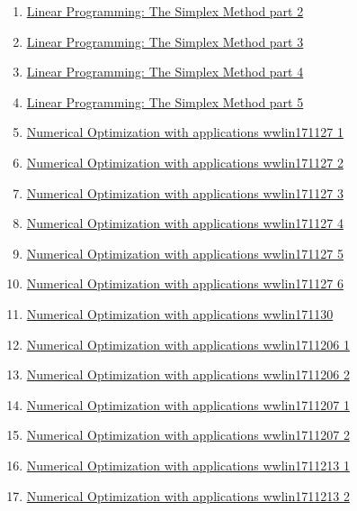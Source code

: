 \documentclass[11pt]{article}
\begin{document}
\begin{enumerate}
	\item \href{https://mp.weixin.qq.com/s/Alzpdjr_mm7GrfE4gVTnPg}{Linear Programming: The Simplex Method part 2}	%
	\item \href{https://mp.weixin.qq.com/s/bJTERRekBH3C9kWN4nvLeg}{Linear Programming: The Simplex Method part 3}	%
	\item \href{https://mp.weixin.qq.com/s/oLZ-1hcsUJasGePLI3KRDg}{Linear Programming: The Simplex Method part 4}	%
	\item \href{https://mp.weixin.qq.com/s/luKMteTACIdbsFNb-bZzNw}{Linear Programming: The Simplex Method part 5}	%
	\item \href{https://mp.weixin.qq.com/s/2ZRzr632s-GtuWGSZgGE0Q}{Numerical Optimization with applications wwlin171127 1}	%
	\item \href{https://mp.weixin.qq.com/s/SDShJZap6JcKOmwg54zO6A}{Numerical Optimization with applications wwlin171127 2}	%
	\item \href{https://mp.weixin.qq.com/s/5DhMMibI_JAZDdl3vX0HYg}{Numerical Optimization with applications wwlin171127 3}	%
	\item \href{https://mp.weixin.qq.com/s/2uhwXd2kA8L-DglJEpvOxA}{Numerical Optimization with applications wwlin171127 4}	%
	\item \href{https://mp.weixin.qq.com/s/rk57CKOfrBLUvtJchXynMw}{Numerical Optimization with applications wwlin171127 5}	%
	\item \href{https://mp.weixin.qq.com/s/XjU6PIpwJnp2HTKpFFoc5Q}{Numerical Optimization with applications wwlin171127 6}	%
	\item \href{https://mp.weixin.qq.com/s/aad67YExUZq_tpbnAMkaig}{Numerical Optimization with applications wwlin171130}	%
	\item \href{https://mp.weixin.qq.com/s/tPBgUwRlx1YtZJQCxHUWTg}{Numerical Optimization with applications wwlin1711206 1}	%
	\item \href{https://mp.weixin.qq.com/s/1hlgKNyoIiUGISWF7Yp0wQ}{Numerical Optimization with applications wwlin1711206 2}	%
	\item \href{https://mp.weixin.qq.com/s/hEHw58A-rIrjklymFNv0ow}{Numerical Optimization with applications wwlin1711207 1}	%
	\item \href{https://mp.weixin.qq.com/s/L5aCNS0uHe3YLN1_Cb0zOw}{Numerical Optimization with applications wwlin1711207 2}	%
	\item \href{https://mp.weixin.qq.com/s/byXO8nL1tuL5maAGtuLX4Q}{Numerical Optimization with applications wwlin1711213 1}	%
	\item \href{https://mp.weixin.qq.com/s/d0rWKOTYA6piSFdOl22K0Q}{Numerical Optimization with applications wwlin1711213 2}	%

\end{enumerate}
\end{document}
